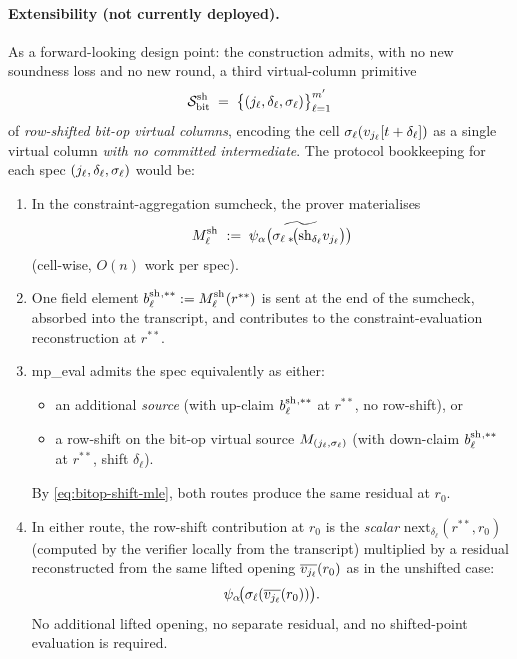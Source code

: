 \paragraph{Extensibility (not currently deployed).} As a forward-looking
design point: the construction admits, with no new soundness loss
and no new round, a third virtual-column primitive
\[
  \mathcal{S}_{\mathrm{bit}}^{\mathrm{sh}_{}} \;=\; \big\{ (j_\ell, \delta_\ell, \sigma_\ell) \big\}_{\ell=1}^{m'}
\]
of \emph{row-shifted bit-op virtual columns}, encoding the cell
$\sigma_\ell(v_{j_\ell}[t + \delta_\ell])$ as a single virtual column
\emph{with no committed intermediate}. The protocol bookkeeping for
each spec $(j_\ell, \delta_\ell, \sigma_\ell)$ would be:
\begin{enumerate}[leftmargin=2em]
  \item In the constraint-aggregation sumcheck, the prover materialises
    \[
      M_{\ell}^{\mathrm{sh}_{}} \;:=\; \widetilde{\psi_{\alpha}\big(\sigma_\ell\,_*\!\big(\mathrm{sh}_{\delta_\ell} v_{j_\ell}\big)\big)}
    \]
    (cell-wise, $O(n)$ work per spec).
  \item One field element $b_{\ell}^{\mathrm{sh}_{}, **} := M_{\ell}^{\mathrm{sh}_{}}(r^{**})$ is
    sent at the end of the sumcheck, absorbed into the transcript, and
    contributes to the constraint-evaluation reconstruction at $r^{**}$.
  \item mp\_eval admits the spec equivalently as either:
    \begin{itemize}[leftmargin=2em]
      \item an additional \emph{source} (with up-claim $b_{\ell}^{\mathrm{sh}_{}, **}$
        at $r^{**}$, no row-shift), or
      \item a row-shift on the bit-op virtual source $M_{(j_\ell,\sigma_\ell)}$
        (with down-claim $b_{\ell}^{\mathrm{sh}_{}, **}$ at $r^{**}$, shift $\delta_\ell$).
    \end{itemize}
    By \cref{eq:bitop-shift-mle}, both routes produce the same residual
    at $r_0$.
  \item In either route, the row-shift contribution at $r_0$ is the
    \emph{scalar} $\mathrm{next}_{\delta_\ell}(r^{**}, r_0)$ (computed
    by the verifier locally from the transcript) multiplied by a
    residual reconstructed from the same lifted opening
    $\overline{v_{j_\ell}}(r_0)$ as in the unshifted case:
    \[
      \psi_{\alpha}\!\big(\sigma_\ell(\overline{v_{j_\ell}}(r_0))\big).
    \]
    No additional lifted opening, no separate residual, and no
    shifted-point evaluation is required.
\end{enumerate}

